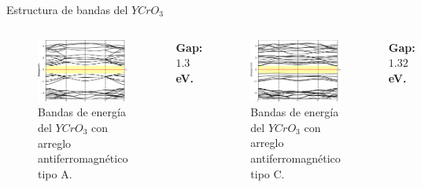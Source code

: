 \begin{frame}{Estructura de bandas del $YCrO_{3}$}
    \begin{columns}[t]
        \begin{figure}[H]
            \centering
            \includegraphics[width=1.0\textwidth]{contenido/resultados/img_resultados/YCO_bandas_A.png}
            \caption{Bandas de energ\'ia del $YCrO_{3}$ con arreglo         
                antiferromagn\'etico tipo A.}
        \end{figure}
        \centering
        \textbf{Gap: $1.3$ eV.}
        \begin{figure}[H]
            \centering
            \includegraphics[width=1.0\textwidth]{contenido/resultados/img_resultados/YCO_bandas_C.png}
            \caption{Bandas de energ\'ia del $YCrO_{3}$ con arreglo 
                antiferromagn\'etico tipo C.}
        \end{figure}
        \centering
        \textbf{Gap: $1.32$ eV.}
    \end{columns}
\end{frame}

